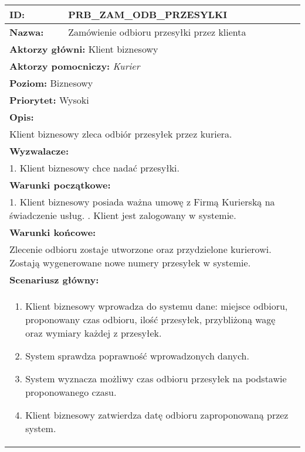 \begin{center}
\begin{longtable}[h]{|p{1.6cm}|p{13.5cm}|}
\hline
\textbf{ID:} & PRB\_ZAM\_ODB\_PRZESYLKI \\ \hline
\textbf{Nazwa:} & Zamówienie odbioru przesyłki przez klienta \\ \hline
\multicolumn{2}{|p{15.1cm}|}{\textbf{Aktorzy główni:}  Klient biznesowy} \\
\multicolumn{2}{|p{15.1cm}|}{\textbf{Aktorzy pomocniczy:}  \textit{Kurier}} \\
\multicolumn{2}{|p{15.1cm}|}{\textbf{Poziom:}  Biznesowy} \\
\multicolumn{2}{|p{15.1cm}|}{\textbf{Priorytet:}  Wysoki} \\
\hline
\multicolumn{2}{|p{15.1cm}|}{\textbf{Opis:}} \\
\multicolumn{2}{|p{15.1cm}|}{Klient biznesowy zleca odbiór przesyłek przez kuriera.
} \\ \hline
\multicolumn{2}{|p{15.1cm}|}{\textbf{Wyzwalacze:}} \\
\multicolumn{2}{|p{15.1cm}|}{1. Klient biznesowy chce nadać przesyłki.
} \\ \hline
\multicolumn{2}{|p{15.1cm}|}{\textbf{Warunki początkowe:}} \\
\multicolumn{2}{|p{15.1cm}|}{
1. Klient biznesowy posiada ważna umowę z Firmą Kurierską na świadczenie usług. \newline
2. Klient jest zalogowany w systemie.
} \\ \hline
\multicolumn{2}{|p{15.1cm}|}{\textbf{Warunki końcowe:}} \\
\multicolumn{2}{|p{15.1cm}|}{
Zlecenie odbioru zostaje utworzone oraz przydzielone kurierowi. Zostają wygenerowane nowe numery przesyłek w systemie.
} \\ \hline
\multicolumn{2}{|p{15.1cm}|}{\textbf{Scenariusz główny:}} \\
\multicolumn{2}{|p{15.1cm}|}{
\begin{enumerate}
\item Klient biznesowy wprowadza do systemu dane: miejsce odbioru, proponowany czas odbioru, ilość przesyłek, przybliżoną wagę oraz wymiary każdej z przesyłek. \label{sce:wpr_dan}
\item System sprawdza poprawność wprowadzonych danych.
\item System wyznacza możliwy czas odbioru przesyłek na podstawie proponowanego czasu. \label{sce:wyzn_czas}
\item Klient biznesowy zatwierdza datę odbioru zaproponowaną przez system.

\end{enumerate}}
\end{longtable}
\end{center}
